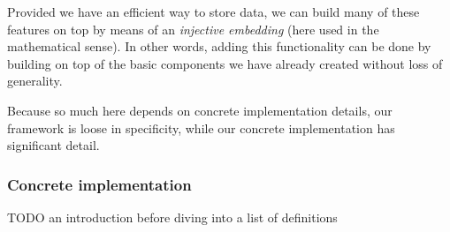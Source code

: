 \documentclass[a4paper,10pt]{article} \usepackage[utf8]{inputenc}
\newcommand{\todo}[1]{{\color{red} TODO #1 }}
\begin{document}
Provided we have an efficient way to store data, we can build many of these
features on top by means of an {\em injective embedding} (here used in the
mathematical sense). In other words, adding this functionality can be done by
building on top of the basic components we have already created without loss of
generality.

Because so much here depends on concrete
implementation details, our framework is loose in specificity, while our
concrete implementation has significant detail.

\subsubsection{Concrete implementation}

\todo{an introduction before diving into a list of definitions}
\end{document}
